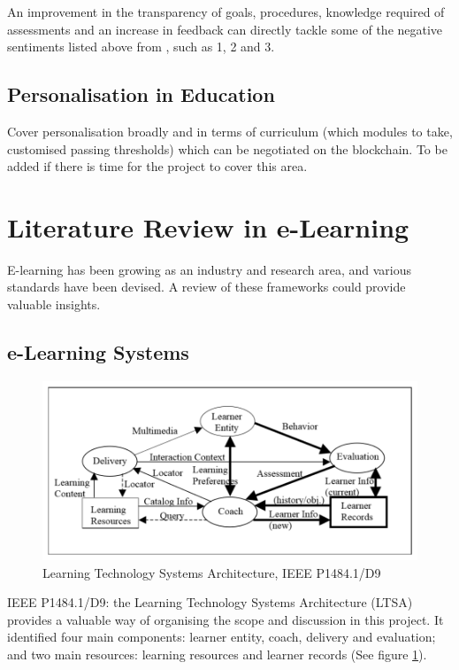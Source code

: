 An improvement in the transparency of goals, procedures, knowledge required of assessments and an increase 
in feedback can directly tackle some of the negative sentiments listed above from \citet{brown1999assessment}, 
such as 1, 2 and 3.

\subsection{Personalisation in Education}

Cover personalisation broadly and in terms of curriculum (which modules to take, 
customised passing thresholds) which can be negotiated on the blockchain.
To be added if there is time for the project to cover this area.

\section{Literature Review in e-Learning}

E-learning has been growing as an industry and research area, and various standards have been devised. 
A review of these frameworks could provide valuable insights.

\subsection{e-Learning Systems}

\begin{figure}[!ht] 
    \centering    
    \includegraphics[width=1.0\textwidth]{LTSA}
    \caption[Learning Technology Systems Architecture]
        {Learning Technology Systems Architecture, IEEE P1484.1/D9 \citep{farance1999learning}}
    \label{fig:LTSA}
\end{figure}

IEEE P1484.1/D9: the Learning Technology Systems Architecture (LTSA) provides a valuable way of organising 
the scope and discussion in this project. It identified four main components: learner entity, coach, 
delivery and evaluation; and two main resources: learning resources and learner records (See figure \ref{fig:LTSA}).

